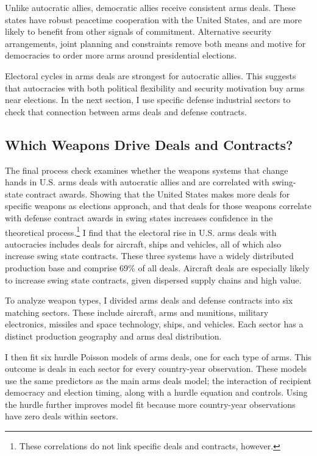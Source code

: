 \documentclass[12pt]{article}
\begin{document}
Unlike autocratic allies, democratic allies receive consistent arms deals. 
These states have robust peacetime cooperation with the United States, and are more likely to benefit from other signals of commitment.
Alternative security arrangements, joint planning and constraints remove both means and motive for democracies to order more arms around presidential elections.


Electoral cycles in arms deals are strongest for autocratic allies. 
This suggests that autocracies with both political flexibility and security motivation buy arms near elections. 
In the next section, I use specific defense industrial sectors to check that connection between arms deals and defense contracts. 



\subsection{Which Weapons Drive Deals and Contracts?} 


The final process check examines whether the weapons systems that change hands in U.S. arms deals with autocratic allies and are correlated with swing-state contract awards. 
Showing that the United States makes more deals for specific weapons as elections approach, and that deals for those weapons correlate with defense contract awards in swing states increases confidence in the theoretical process.\footnote{These correlations do not link specific deals and contracts, however.}
I find that the electoral rise in U.S. arms deals with autocracies includes deals for aircraft, ships and vehicles, all of which also increase swing state contracts. 
These three systems have a widely distributed production base and comprise 69\% of all deals. 
Aircraft deals are especially likely to increase swing state contracts, given dispersed supply chains and high value. 


To analyze weapon types, I divided arms deals and defense contracts into six matching sectors. 
These include aircraft, arms and munitions, military electronics, missiles and space technology, ships, and vehicles.  
Each sector has a distinct production geography and arms deal distribution.


I then fit six hurdle Poisson models of arms deals, one for each type of arms. 
This outcome is deals in each sector for every country-year observation. 
These models use the same predictors as the main arms deals model; the interaction of recipient democracy and election timing, along with a hurdle equation and controls.
Using the hurdle further improves model fit because more country-year observations have zero deals within sectors. 
\end{document}
